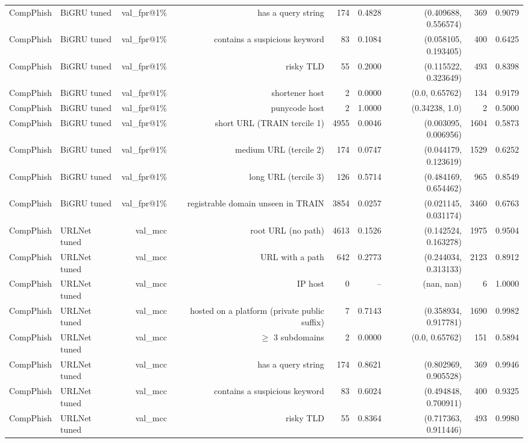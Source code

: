 \begin{table}[t]
\begin{tabular}{llrrrrrrr}
CompPhish & BiGRU tuned & val\_fpr@1\% & has a query string & 174 & 0.4828 & (0.409688, 0.556574) & 369 & 0.9079 \\
CompPhish & BiGRU tuned & val\_fpr@1\% & contains a suspicious keyword & 83 & 0.1084 & (0.058105, 0.193405) & 400 & 0.6425 \\
CompPhish & BiGRU tuned & val\_fpr@1\% & risky TLD & 55 & 0.2000 & (0.115522, 0.323649) & 493 & 0.8398 \\
CompPhish & BiGRU tuned & val\_fpr@1\% & shortener host & 2 & 0.0000 & (0.0, 0.65762) & 134 & 0.9179 \\
CompPhish & BiGRU tuned & val\_fpr@1\% & punycode host & 2 & 1.0000 & (0.34238, 1.0) & 2 & 0.5000 \\
CompPhish & BiGRU tuned & val\_fpr@1\% & short URL (TRAIN tercile 1) & 4955 & 0.0046 & (0.003095, 0.006956) & 1604 & 0.5873 \\
CompPhish & BiGRU tuned & val\_fpr@1\% & medium URL (tercile 2) & 174 & 0.0747 & (0.044179, 0.123619) & 1529 & 0.6252 \\
CompPhish & BiGRU tuned & val\_fpr@1\% & long URL (tercile 3) & 126 & 0.5714 & (0.484169, 0.654462) & 965 & 0.8549 \\
CompPhish & BiGRU tuned & val\_fpr@1\% & registrable domain unseen in TRAIN & 3854 & 0.0257 & (0.021145, 0.031174) & 3460 & 0.6763 \\
CompPhish & URLNet tuned & val\_mcc & root URL (no path) & 4613 & 0.1526 & (0.142524, 0.163278) & 1975 & 0.9504 \\
CompPhish & URLNet tuned & val\_mcc & URL with a path & 642 & 0.2773 & (0.244034, 0.313133) & 2123 & 0.8912 \\
CompPhish & URLNet tuned & val\_mcc & IP host & 0 & -- & (nan, nan) & 6 & 1.0000 \\
CompPhish & URLNet tuned & val\_mcc & hosted on a platform (private public suffix) & 7 & 0.7143 & (0.358934, 0.917781) & 1690 & 0.9982 \\
CompPhish & URLNet tuned & val\_mcc & $\geq$ 3 subdomains & 2 & 0.0000 & (0.0, 0.65762) & 151 & 0.5894 \\
CompPhish & URLNet tuned & val\_mcc & has a query string & 174 & 0.8621 & (0.802969, 0.905528) & 369 & 0.9946 \\
CompPhish & URLNet tuned & val\_mcc & contains a suspicious keyword & 83 & 0.6024 & (0.494848, 0.700911) & 400 & 0.9325 \\
CompPhish & URLNet tuned & val\_mcc & risky TLD & 55 & 0.8364 & (0.717363, 0.911446) & 493 & 0.9980 \\

\end{tabular}
\end{table}
